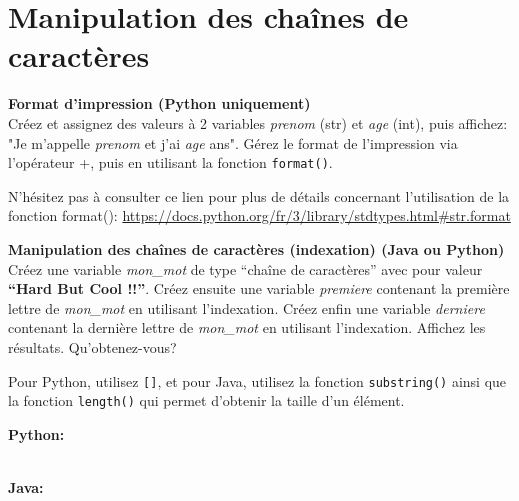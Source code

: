 \newpage

\section{Manipulation des chaînes de caractères}

\begin{Exercice}[5 minutes] \textbf{Format d'impression (Python uniquement)}\\
    Créez et assignez des valeurs à 2 variables \textit{prenom} (str) et \textit{age} (int), puis affichez: "Je m'appelle \textit{prenom} et j'ai \textit{age} ans". Gérez le format de l'impression via l'opérateur +, puis en utilisant la fonction \lstinline{format()}. \\
    
     \begin{conseil}
        N'hésitez pas à consulter ce lien pour plus de détails concernant l'utilisation de la fonction format(): \url{https://docs.python.org/fr/3/library/stdtypes.html\#str.format}
     \end{conseil}
     \begin{solution}
      
     
            
     \end{solution}   
 \end{Exercice}

\begin{Exercice}[5 minutes] \textbf{Manipulation des chaînes de caractères (indexation) (Java ou Python)}\\
    Créez une variable \textit{mon\_mot} de type ``chaîne de caractères'' avec pour valeur \textbf{``Hard But Cool !!''}. Créez ensuite une variable \textit{premiere} contenant la première lettre de \textit{mon\_mot} en utilisant l'indexation. Créez enfin une variable \textit{derniere} contenant la dernière lettre de \textit{mon\_mot} en utilisant l'indexation. Affichez les résultats. Qu'obtenez-vous? \\
    
     \begin{conseil}
           Pour Python, utilisez \lstinline{[]}, et pour Java, utilisez la fonction \lstinline{substring()} ainsi que la fonction \lstinline{length()} qui permet d'obtenir la taille d'un élément.
         
     \end{conseil}
     \begin{solution}
     
     \textbf{Python:}
     
     
     \textbf{\\Java:}
     
            
     \end{solution}   
 \end{Exercice}

